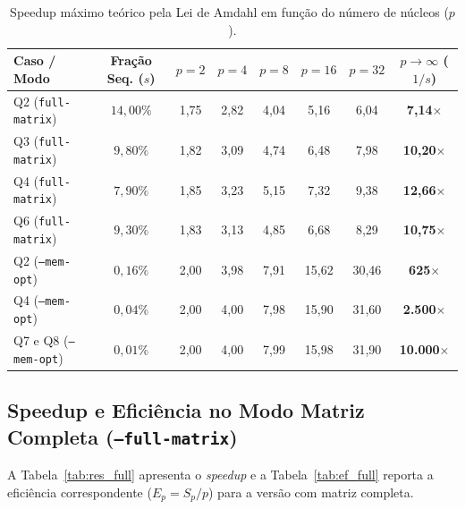 \begin{table}[H]
\centering
\small
\caption{Speedup máximo teórico pela Lei de Amdahl em função do número de núcleos ($p$).}
\label{tab:amdahl}
\begin{tabular}{@{}lccccccc@{}}
\toprule
\textbf{Caso / Modo} & \textbf{Fração Seq. ($s$)} & \textbf{$p=2$} & \textbf{$p=4$} & \textbf{$p=8$} & \textbf{$p=16$} & \textbf{$p=32$} & \textbf{$p \to \infty$ ($1/s$)} \\ \midrule
Q2 (\texttt{full-matrix}) & $14{,}00\%$ & 1{,}75 & 2{,}82 & 4{,}04 & 5{,}16 & 6{,}04 & \textbf{7{,}14$\times$} \\
Q3 (\texttt{full-matrix}) & $9{,}80\%$  & 1{,}82 & 3{,}09 & 4{,}74 & 6{,}48 & 7{,}98 & \textbf{10{,}20$\times$} \\
Q4 (\texttt{full-matrix}) & $7{,}90\%$  & 1{,}85 & 3{,}23 & 5{,}15 & 7{,}32 & 9{,}38 & \textbf{12{,}66$\times$} \\
Q6 (\texttt{full-matrix}) & $9{,}30\%$  & 1{,}83 & 3{,}13 & 4{,}85 & 6{,}68 & 8{,}29 & \textbf{10{,}75$\times$} \\ \midrule
Q2 (\texttt{--mem-opt})   & $0{,}16\%$  & 2{,}00 & 3{,}98 & 7{,}91 & 15{,}62 & 30{,}46 & \textbf{625$\times$} \\
Q4 (\texttt{--mem-opt})   & $0{,}04\%$  & 2{,}00 & 4{,}00 & 7{,}98 & 15{,}90 & 31{,}60 & \textbf{2.500$\times$} \\
Q7 e Q8 (\texttt{--mem-opt}) & $0{,}01\%$  & 2{,}00 & 4{,}00 & 7{,}99 & 15{,}98 & 31{,}90 & \textbf{10.000$\times$} \\ \bottomrule
\end{tabular}
\end{table}

\subsection{Speedup e Eficiência no Modo Matriz Completa (\texttt{--full-matrix})}

A Tabela~\ref{tab:res_full} apresenta o \textit{speedup} e a Tabela~\ref{tab:ef_full} reporta a eficiência correspondente ($E_p = S_p / p$) para a versão com matriz completa.

